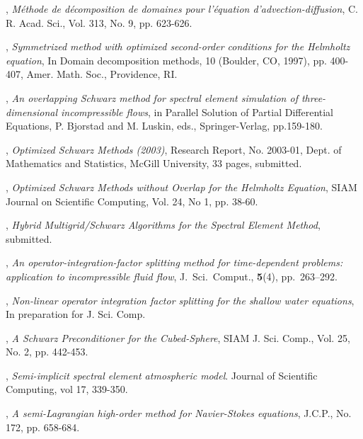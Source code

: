 \documentclass{report}
\begin{document}
,
{\em M\'ethode de d\'ecomposition de domaines pour l'\'equation d'advection-diffusion},
C. R. Acad. Sci., Vol. 313, No. 9, pp. 623-626.

,
{\em Symmetrized method with optimized second-order conditions for the
Helmholtz equation},
In Domain decomposition methods, 10 (Boulder, CO, 1997), pp. 400-407, Amer. Math. Soc.,
Providence, RI.

,
{\em An overlapping Schwarz method for spectral element simulation of
three-dimensional
incompressible flows},
in Parallel Solution of Partial Differential Equations, P. Bjorstad and M.
Luskin, eds.,
Springer-Verlag, pp.159-180.

, {\em Optimized Schwarz Methods (2003)},
Research Report, No. 2003-01, Dept. of Mathematics and Statistics,
McGill University, 33 pages, submitted.

,
{\em Optimized Schwarz Methods without Overlap for the Helmholtz
Equation},
SIAM Journal on Scientific Computing, Vol. 24, No 1, pp. 38-60.

,
{\em Hybrid Multigrid/Schwarz Algorithms for the Spectral Element Method},
submitted.

,
{\em An operator-integration-factor splitting method for time-dependent
problems: application to incompressible fluid flow},
J.~Sci.~Comput., {\bf 5}(4), pp.~263--292.

,
{\em Non-linear operator integration factor splitting for the shallow
water equations},
In preparation for J. Sci. Comp.

,
{\em A Schwarz Preconditioner for the Cubed-Sphere},
SIAM J. Sci. Comp., Vol. 25, No. 2, pp. 442-453.

,
{\em Semi-implicit spectral element atmospheric model}.
Journal of Scientific Computing, vol 17, 339-350.

,
{\em A semi-Lagrangian high-order method for Navier-Stokes equations},
J.C.P., No. 172, pp. 658-684.
\end{document}

